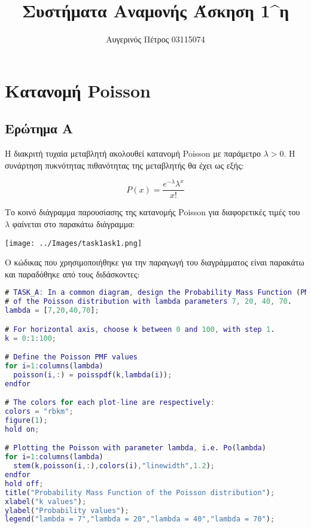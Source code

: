 \documentclass[12pt]{article}
\author{Αυγερινός Πέτρος 03115074}
\title{Συστήματα Αναμονής Άσκηση 1^η}
\date{}
\begin{document}
\maketitle 
\pagebreak

\tableofcontents

\pagebreak

\section{Κατανομή Poisson}

\subsection{Ερώτημα A}
Η διακριτή τυχαία μεταβλητή ακολουθεί κατανομή Poisson με παράμετρο 
$\lambda > 0$. Η συνάρτηση πυκνότητας πιθανότητας της μεταβλητής θα
έχει ως εξής:

\begin{equation}
    P(x) = \frac{e^{-\lambda} \lambda^x}{x!}
\end{equation}

Το κοινό διάγραμμα παρουσίασης της κατανομής Poisson για διαφορετικές 
τιμές του $\lambda$ φαίνεται στο παρακάτω διάγραμμα:

\begin{center}
\texttt{[image: ../Images/task1ask1.png]}
\end{center}

Ο κώδικας που χρησιμοποιήθηκε για την παραγωγή του διαγράμματος είναι παρακάτω και 
παραδόθηκε από τους διδάσκοντες:

\begin{lstlisting}[language=matlab]
# TASK_A: In a common diagram, design the Probability Mass Function (PMF)
# of the Poisson distribution with lambda parameters 7, 20, 40, 70. 
lambda = [7,20,40,70];

# For horizontal axis, choose k between 0 and 100, with step 1.
k = 0:1:100;

# Define the Poisson PMF values
for i=1:columns(lambda)
  poisson(i,:) = poisspdf(k,lambda(i));
endfor

# The colors for each plot-line are respectively:
colors = "rbkm";
figure(1);
hold on;

# Plotting the Poisson with parameter lambda, i.e. Po(lambda)
for i=1:columns(lambda)
  stem(k,poisson(i,:),colors(i),"linewidth",1.2);
endfor
hold off;
title("Probability Mass Function of the Poisson distribution");
xlabel("k values");
ylabel("Probability values");
legend("lambda = 7","lambda = 20","lambda = 40","lambda = 70");
\end{lstlisting}
\end{document}
